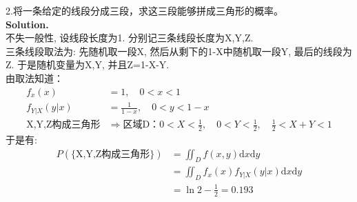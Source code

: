 \documentclass[UTF8]{article}
\begin{document}
\noindent 2.将一条给定的线段分成三段，求这三段能够拼成三角形的概率。 \\
\noindent \textbf{Solution.} \\
不失一般性, 设线段长度为1. 分别记三条线段长度为X,Y,Z. \\
三条线段取法为: 先随机取一段X, 然后从剩下的1-X中随机取一段Y, 最后的线段为Z. 于是随机变量为X,Y, 并且Z=1-X-Y. \\
由取法知道：
\begin{align*}
f_x(x) & = 1, \quad 0<x<1 \\
f_{Y|X}(y|x) & = \frac{1}{1-x}, \quad 0<y<1-x \\
\text{X,Y,Z构成三角形} & \Longrightarrow \text{区域D：}0<X<\frac{1}{2}, \quad 0<Y<\frac{1}{2},\quad \frac{1}{2}<X+Y<1
\end{align*}
于是有: 
\begin{align*}
P(\{\text{X,Y,Z构成三角形}\}) & = \iint_{D} f(x,y)\mathrm{d}x\mathrm{d}y  \\
 & = \iint_{D} f_x(x) f_{Y|X}(y|x) \mathrm{d}x\mathrm{d}y \\
 & = \ln2 - \frac{1}{2}= 0.193
\end{align*}
\end{document}
